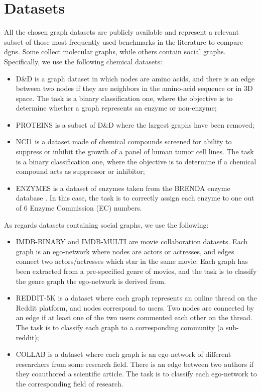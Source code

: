 \section{Datasets}
All the chosen graph  datasets are  publicly  available \citep{kersting2016benchmark}  and  represent  a  relevant subset of those most frequently used benchmarks in the literature to compare \glspl{dgn}. Some collect molecular graphs, while others contain social graphs. Specifically, we use the following chemical datasets:
\begin{itemize}
    \item D\&D \citep{dobson2003dd} is a graph dataset in which nodes are amino acids, and there is an edge between two nodes if they are neighbors in the amino-acid sequence or in 3D space. The task is a binary classification one, where the objective is to determine whether a graph represents an enzyme or non-enzyme;
    \item PROTEINS \citep{borgwardt2005proteins} is a subset of D\&D where the largest graphs have been removed;
    \item NCI1 \citep{wale2008nci1} is a dataset made of chemical compounds screened for ability to suppress or inhibit the growth of a panel of human tumor cell lines. The task is a binary classification one, where the objective is to determine if a chemical compound acts as suppressor or inhibitor;
    \item ENZYMES is a dataset of enzymes taken from the BRENDA enzyme database \citep{schomburg2004enzymes}. In this case, the task is to correctly assign each enzyme to one out of 6 Enzyme Commission (EC) numbers.
\end{itemize}
As regards datasets containing social graphs, we use the following:
\begin{itemize}
    \item IMDB-BINARY and IMDB-MULTI \citep{yanardag2015imdbredditcollab} are movie collaboration datasets. Each graph is an ego-network where nodes are actors or actresses, and edges connect two actors/actresses which star in the same movie. Each graph has been extracted from a pre-specified genre of movies, and the task is to classify the genre graph the ego-network is derived from.
    \item REDDIT-5K \citep{yanardag2015imdbredditcollab} is a dataset where each graph represents an online thread on the Reddit platform, and nodes correspond to users. Two nodes are connected by an edge if at least one of the two users commented each other on the thread. The task is to classify each graph to a corresponding community (a sub-reddit);
    \item COLLAB \citep{yanardag2015imdbredditcollab} is a dataset where each graph is an ego-network of different researchers from some research field. There is an edge between two authors if they coauthored a scientific article. The task is to classify each ego-network to the corresponding field of research.
\end{itemize}
